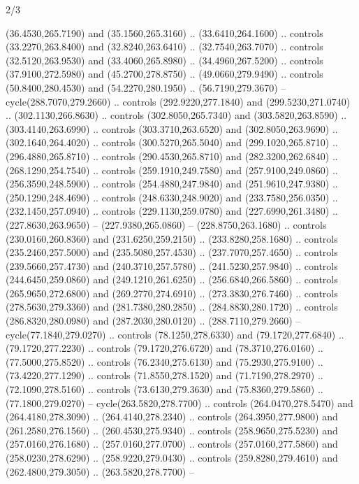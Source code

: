 \begin{flagdescription}{2/3}
\begin{scope}[xshift=0.5\flaglength,yshift=0.5\flagwidth,scale=\stretchfactor]
\begin{scope}[scale=0.001645\flagwidth,yshift=65mm,xshift=-63mm]
\begin{scope}[y=0.80pt, x=0.80pt, yscale=-1,]
\begin{scope}[cm={{1.33333,0.0,0.0,1.33333,(0.0,1e-05)}}]
  (36.4530,265.7190) and (35.1560,265.3160) .. (33.6410,264.1600) .. controls
  (33.2270,263.8400) and (32.8240,263.6410) .. (32.7540,263.7070) .. controls
  (32.5120,263.9530) and (33.4060,265.8980) .. (34.4960,267.5200) .. controls
  (37.9100,272.5980) and (45.2700,278.8750) .. (49.0660,279.9490) .. controls
  (50.8400,280.4530) and (54.2270,280.1950) .. (56.7190,279.3670) --
  cycle(288.7070,279.2660) .. controls (292.9220,277.1840) and
  (299.5230,271.0740) .. (302.1130,266.8630) .. controls (302.8050,265.7340) and
  (303.5820,263.8590) .. (303.4140,263.6990) .. controls (303.3710,263.6520) and
  (302.8050,263.9690) .. (302.1640,264.4020) .. controls (300.5270,265.5040) and
  (299.1020,265.8710) .. (296.4880,265.8710) .. controls (290.4530,265.8710) and
  (282.3200,262.6840) .. (268.1290,254.7540) .. controls (259.1910,249.7580) and
  (257.9100,249.0860) .. (256.3590,248.5900) .. controls (254.4880,247.9840) and
  (251.9610,247.9380) .. (250.1290,248.4690) .. controls (248.6330,248.9020) and
  (233.7580,256.0350) .. (232.1450,257.0940) .. controls (229.1130,259.0780) and
  (227.6990,261.3480) .. (227.8630,263.9650) -- (227.9380,265.0860) --
  (228.8750,263.1680) .. controls (230.0160,260.8360) and (231.6250,259.2150) ..
  (233.8280,258.1680) .. controls (235.2460,257.5000) and (235.5080,257.4530) ..
  (237.7070,257.4650) .. controls (239.5660,257.4730) and (240.3710,257.5780) ..
  (241.5230,257.9840) .. controls (244.6450,259.0860) and (249.1210,261.6250) ..
  (256.6840,266.5860) .. controls (265.9650,272.6800) and (269.2770,274.6910) ..
  (273.3830,276.7460) .. controls (278.5630,279.3360) and (281.7380,280.2850) ..
  (284.8830,280.1720) .. controls (286.8320,280.0980) and (287.2030,280.0120) ..
  (288.7110,279.2660) -- cycle(77.1840,279.0270) .. controls (78.1250,278.6330)
  and (79.1720,277.6840) .. (79.1720,277.2230) .. controls (79.1720,276.6720)
  and (78.3710,276.0160) .. (77.5000,275.8520) .. controls (76.2340,275.6130)
  and (75.2930,275.9100) .. (73.4220,277.1290) .. controls (71.8550,278.1520)
  and (71.7190,278.2970) .. (72.1090,278.5160) .. controls (73.6130,279.3630)
  and (75.8360,279.5860) .. (77.1800,279.0270) -- cycle(263.5820,278.7700) ..
  controls (264.0470,278.5470) and (264.4180,278.3090) .. (264.4140,278.2340) ..
  controls (264.3950,277.9800) and (261.2580,276.1560) .. (260.4530,275.9340) ..
  controls (258.9650,275.5230) and (257.0160,276.1680) .. (257.0160,277.0700) ..
  controls (257.0160,277.5860) and (258.0230,278.6290) .. (258.9220,279.0430) ..
  controls (259.8280,279.4610) and (262.4800,279.3050) .. (263.5820,278.7700) --

\end{scope}
\end{scope}
\end{scope}
\end{scope}
\end{flagdescription}
